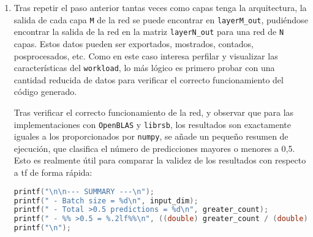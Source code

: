 \begin{enumerate}
    Si bien es cierto que en lugar de aplicar los \textit{bias} junto a la función de transferencia en la función previa, es posible realizar $C = AB + bias$, con una copia de \textit{bias} por fila, es mejor realizar esta operación en conjunción con la aplicación de la función de transferencia, ya que así se obtiene una mayor intensidad aritmética. Esta mayor intensidad aritmética es especialmente relevante cuando una función se paraleliza, ya que lo más probable es que \texttt{map\_and\_bias} sea \textit{memory-bound} en mayor o menor medida en función de la función de transferencia. Además, si se realizara operación sobre una matriz pre-inicializada con los \textit{bias} en cada fila, se necesitaría replicar los valores de \textit{bias} \texttt{input\_dim}\footnote{Se denomina \texttt{input\_dim} al número de filas de la entrada, es decir, el número de datos multidimensionales que entran a la red.} veces, replicación que no es gratuita.

    Una implementación básica de \texttt{map\_and\_bias} es similar a la siguiente:\medskip
\begin{lstlisting}[language=C]
void map_and_bias__fp32(fp32 *restrict A, const fp32 *restrict bias, const uint32_t M, const uint32_t N, fp32 (* map_function)(fp32 x)){
    for (uint32_t i = 0; i < M; i++){
        for(uint32_t j = 0; j < N; j++){
            A[i*N+j].val = map_function((fp32)(A[i*N+j].val +
                                        bias[j].val)).val;
        }
    }
}
\end{lstlisting}

    \item Tras repetir el paso anterior tantas veces como capas tenga la arquitectura, la salida de cada capa \texttt{M} de la red se puede encontrar en \texttt{layerM\_out}, pudiéndose encontrar la salida de la red en la matriz \texttt{layerN\_out} para una red de \texttt{N} capas. Estos datos pueden ser exportados, mostrados, contados, posprocesados, etc. Como en este caso interesa perfilar y visualizar las características del \texttt{workload}, lo más lógico es primero probar con una cantidad reducida de datos para verificar el correcto funcionamiento del código generado.
    
    Tras verificar el correcto funcionamiento de la red, y observar que para las implementaciones con \texttt{OpenBLAS} y \texttt{librsb}, los resultados son exactamente iguales a los proporcionados por \texttt{numpy}, se añade un pequeño resumen de ejecución, que clasifica el número de predicciones mayores o menores a 0,5. Esto es realmente útil para comparar la validez de los resultados con respecto a \acrlong{tf} de forma rápida:\medskip
\begin{lstlisting}[language=C]
printf("\n\n--- SUMMARY ---\n");
printf(" - Batch size = %d\n", input_dim);
printf(" - Total >0.5 predictions = %d\n", greater_count);
printf(" - %% >0.5 = %.2lf%%\n", ((double) greater_count / (double) input_dim)*100);
printf("\n");
\end{lstlisting}

\end{enumerate}


